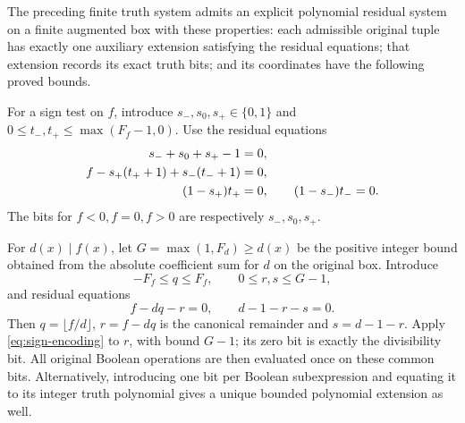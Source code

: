 \begin{lemma}
\label{lem:canonical-auxiliary}
The preceding finite truth system admits an explicit polynomial
residual system on a finite augmented box with these properties:
each admissible original tuple has exactly one auxiliary
extension satisfying the residual equations; that extension
records its exact truth bits; and its coordinates have the
following proved bounds.

For a sign test on \(f\), introduce
\(s_-,s_0,s_+\in\{0,1\}\) and
\(0\le t_-,t_+\le\max(F_f-1,0)\).
Use the residual equations
\begin{align}
 s_-+s_0+s_+-1&=0,\notag\\
 f-s_+(t_++1)+s_-(t_-+1)&=0,\label{eq:sign-encoding}\\
 (1-s_+)t_+&=0,\qquad(1-s_-)t_-=0.\notag
\end{align}
The bits for \(f<0,f=0,f>0\) are respectively
\(s_-,s_0,s_+\).

For \(d(x)\mid f(x)\), let \(G=\max(1,F_d)\ge d(x)\)
be the positive integer bound obtained from the absolute
coefficient sum for \(d\) on the original box.  Introduce
\[
 -F_f\le q\le F_f,\qquad 0\le r,s\le G-1,
\]
and residual equations
\begin{equation}\label{eq:quotient-encoding}
 f-dq-r=0,\qquad d-1-r-s=0.
\end{equation}
Then \(q=\lfloor f/d\rfloor\), \(r=f-dq\) is the
canonical remainder and \(s=d-1-r\).  Apply
\eqref{eq:sign-encoding} to \(r\), with bound \(G-1\);
its zero bit is exactly the divisibility bit.
All original Boolean operations are then evaluated once on
these common bits.  Alternatively, introducing one bit per
Boolean subexpression and equating it to its integer truth
polynomial gives a unique bounded polynomial extension as well.
\end{lemma}
